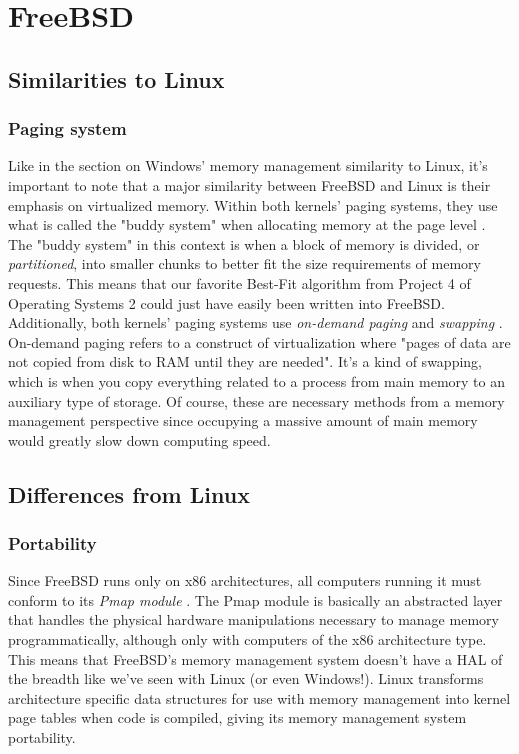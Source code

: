 \documentclass[letterpaper,10pt,titlepage]{article}
\begin{document}
\section{FreeBSD}
\subsection{Similarities to Linux}
\subsubsection{Paging system}
Like in the section on Windows' memory management similarity to Linux, it's important to note that a major similarity between FreeBSD and Linux is their emphasis on virtualized memory. Within both kernels' paging systems, they use what is called the "buddy system" when allocating memory at the page level \cite{freeBSD1} \cite{linux2}. The "buddy system" in this context is when a block of memory is divided, or \emph{partitioned}, into smaller chunks to better fit the size requirements of memory requests. This means that our favorite Best-Fit algorithm from Project 4 of Operating Systems 2 could just have easily been written into FreeBSD. Additionally, both kernels' paging systems use \emph{on-demand paging} and \emph{swapping} \cite{freeBSD2} \cite{linux}. On-demand paging refers to a construct of virtualization where "pages of data are not copied from disk to RAM until they are needed". It's a kind of swapping, which is when you copy everything related to a process from main memory to an auxiliary type of storage. Of course, these are necessary methods from a memory management perspective since occupying a massive amount of main memory would greatly slow down computing speed. 
\subsection{Differences from Linux}
\subsubsection{Portability}
Since FreeBSD runs only on x86 architectures, all computers running it must conform to its \emph{Pmap module} \cite{freeBSD1}. The Pmap module is basically an abstracted layer that handles the physical hardware manipulations necessary to manage memory programmatically, although only with computers of the x86 architecture type. This means that FreeBSD's memory management system doesn't have a HAL of the breadth like we've seen with Linux (or even Windows!). Linux transforms architecture specific data structures for use with memory management into kernel page tables when code is compiled, giving its memory management system portability. 
\end{document}
